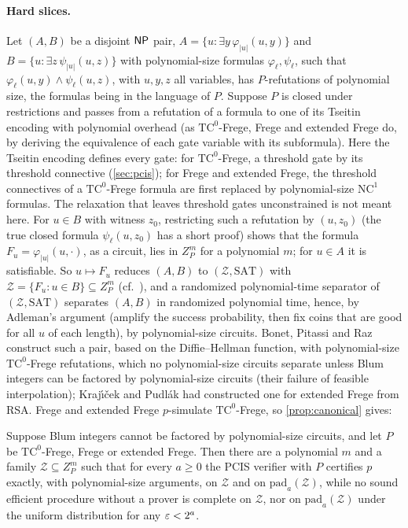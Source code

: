 \paragraph{Hard slices.} Let $(A,B)$ be a disjoint $\mathsf{NP}$ pair,
$A=\{u:\exists y\,\varphi_{|u|}(u,y)\}$ and $B=\{u:\exists z\,\psi_{|u|}(u,z)\}$
with polynomial-size formulas $\varphi_\ell,\psi_\ell$, such that
$\varphi_\ell(u,y)\wedge\psi_\ell(u,z)$, with $u,y,z$ all variables, has
$P$-refutations of polynomial size, the formulas being in the language of $P$.
Suppose $P$ is closed under restrictions and passes from a refutation of a formula
to one of its Tseitin encoding with polynomial overhead (as $\mathrm{TC}^0$-Frege,
Frege and extended Frege do, by deriving the equivalence of each gate variable with
its subformula). Here the Tseitin encoding defines every gate: for
$\mathrm{TC}^0$-Frege, a threshold gate by its threshold connective (\cref{sec:pcis});
for Frege and extended Frege, the threshold connectives of a $\mathrm{TC}^0$-Frege
formula are first replaced by polynomial-size $\mathrm{NC}^1$ formulas. The relaxation
that leaves threshold gates unconstrained is not meant here. For $u\in B$
with witness $z_0$, restricting such a refutation by $(u,z_0)$ (the true closed
formula $\psi_\ell(u,z_0)$ has a short proof) shows that the formula
$F_u=\varphi_{|u|}(u,\cdot)$, as a circuit, lies in $Z_P^m$ for a polynomial $m$; for
$u\in A$ it is satisfiable. So $u\mapsto F_u$ reduces $(A,B)$ to $(\mathcal
Z,\mathrm{SAT})$ with $\mathcal Z=\{F_u:u\in B\}\subseteq Z_P^m$ (cf.\
\cite{razborov1994pairs,pudlak2003pairs}), and a randomized polynomial-time separator
of $(\mathcal Z,\mathrm{SAT})$ separates $(A,B)$ in randomized polynomial time,
hence, by Adleman's argument \cite{adleman1978} (amplify the success probability,
then fix coins that are good for all $u$ of each length), by polynomial-size
circuits. Bonet, Pitassi and Raz \cite{bpr2000} construct such a pair, based on the
Diffie--Hellman function, with polynomial-size $\mathrm{TC}^0$-Frege refutations,
which no polynomial-size circuits separate unless Blum integers can be factored by
polynomial-size circuits (their failure of feasible interpolation); Kraj\'{\i}\v{c}ek
and Pudl\'ak \cite{kp1998} had constructed one for extended Frege from RSA. Frege and
extended Frege $p$-simulate $\mathrm{TC}^0$-Frege, so \cref{prop:canonical} gives:

\begin{corollary}\label{cor:automatability}
Suppose Blum integers cannot be factored by polynomial-size circuits, and let $P$
be $\mathrm{TC}^0$-Frege, Frege or extended Frege. Then there are a polynomial $m$
and a family $\mathcal Z\subseteq Z_P^m$ such that for every $a\ge0$ the PCIS
verifier with $P$ certifies $p$ exactly, with polynomial-size arguments, on
$\mathcal Z$ and on $\mathrm{pad}_a(\mathcal Z)$, while no sound efficient procedure
without a prover is complete on $\mathcal Z$, nor on $\mathrm{pad}_a(\mathcal Z)$
under the uniform distribution for any $\varepsilon<2^a$.
\end{corollary}

